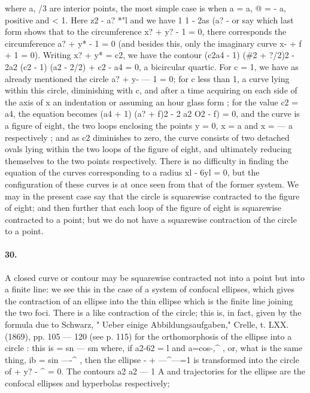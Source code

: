 \documentclass[11pt,a4paper]{book}
\begin{document}
{{{{where    a,   /3   are   interior   points,    the   most   simple   case   is   when   a  =  a,   @  =  -  a,  positive
and  <  1.     Here
z2  -  a?
*"l
and  we  have
1      1  -  2as  (a?  -
or  say
which  last  form  shows  that  to  the  circumference  x?  +  y?  -  1  =  0,  there  corresponds  the
circumference  a?  +  y*  -  1  =  0  (and  besides  this,  only  the  imaginary  curve  x-  +  f  +  1  =  0).
Writing  x?  +  y*  =  c2,  we  have  the  contour
(c2a4  -  1)  (\#2  +  ?/2)2  -  2a2  (c2  -  1)  (a2  -  2/2)  +  c2  -  a4  =  0,
a  bicircular  quartic.  For  c  =  1,  we  have  as  already  mentioned  the  circle  a?  +  y-  ---  1  =  0;
for  c  less  than  1,  a  curve  lying  within  this  circle,  diminishing  with  c,  and  after  a
time  acquiring  on  each  side  of  the  axis  of  x  an  indentation  or  assuming  an  hour
glass  form  ;  for  the  value  c2  =  a4,  the  equation  becomes
(a4  +  1)  (a?  +  f)2  -  2  a2  O2  -  f)  =  0,
and  the  curve  is  a  figure  of  eight,  the  two  loops  enclosing  the  points  y  =  0,  x  =  a
and  x  =  ---  a  respectively  ;  and  as  c2  diminishes  to  zero,  the  curve  consists  of  two
detached  ovals  lying  within  the  two  loops  of  the  figure  of  eight,  and  ultimately
reducing  themselves  to  the  two  points  respectively.  There  is  no  difficulty  in  finding
the  equation  of  the  curves  corresponding  to  a  radius  xl  -  6yl  =  0,  but  the  configuration
of  these  curves  is  at  once  seen  from  that  of  the  former  system.  We  may  in  the
present  case  say  that  the  circle  is  squarewise  contracted  to  the  figure  of  eight;  and
then  further  that  each  loop  of  the  figure  of  eight  is  squarewise  contracted  to  a
point;  but  we  do  not  have  a  squarewise  contraction  of  the  circle  to  a  point.
\paragraph{30.} A  closed  curve  or  contour  may  be  squarewise  contracted  not  into  a  point
but  into  a  finite  line:  we  see  this  in  the  case  of  a  system  of  confocal  ellipses,
which  gives  the  contraction  of  an  ellipse  into  the  thin  ellipse  which  is  the  finite
line  joining  the  two  foci.  There  is  a  like  contraction  of  the  circle;  this  is,  in  fact,
given  by  the  formula  due  to  Schwarz,  "  Ueber  einige  Abbildungsaufgaben,"  Crelle,
t.  LXX.  (1869),  pp.  105  ---  120  (see  p.  115)  for  the  orthomorphosis  of  the  ellipse  into
a  circle  :  this  is
=  sn  ---  sm
where,   if  a2-62  =  l    and   a=cos-,^  ,   or,    what   is   the  same   thing,    ib  =  sin  ----^  ,   then
the   ellipse   -  +  ---^---=1    is   transformed   into   the  circle  of  +  y?  -  ^  =  0.     The  contours
a2     a2  ---  1  A
and   trajectories   for    the   ellipse   are    the    confocal    ellipses    and    hyperbolas    respectively;


}}}}
\end{document}
